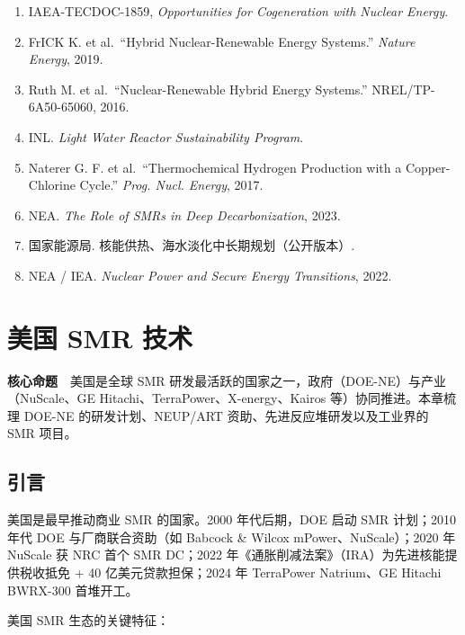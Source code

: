 \documentclass[
  UTF8,
  scheme=plain,
  fontsize=10pt,
  openany
]{ctexbook}
\begin{document}
\begin{enumerate}
\def\labelenumi{\arabic{enumi}.}
\tightlist
\item
  IAEA-TECDOC-1859, \emph{Opportunities for Cogeneration with Nuclear
  Energy}.
\item
  FrICK K. et al.~``Hybrid Nuclear-Renewable Energy Systems.''
  \emph{Nature Energy}, 2019.
\item
  Ruth M. et al.~``Nuclear-Renewable Hybrid Energy Systems.''
  NREL/TP-6A50-65060, 2016.
\item
  INL. \emph{Light Water Reactor Sustainability Program}.
\item
  Naterer G. F. et al.~``Thermochemical Hydrogen Production with a
  Copper-Chlorine Cycle.'' \emph{Prog. Nucl. Energy}, 2017.
\item
  NEA. \emph{The Role of SMRs in Deep Decarbonization}, 2023.
\item
  国家能源局. 核能供热、海水淡化中长期规划（公开版本）.
\item
  NEA / IEA. \emph{Nuclear Power and Secure Energy Transitions}, 2022.
\end{enumerate}

\cleardoublepage

\chapter{美国 SMR 技术}\label{ux7f8eux56fd-smr-ux6280ux672f}

\begin{epigraph}

\textbf{核心命题}　美国是全球 SMR
研发最活跃的国家之一，政府（DOE-NE）与产业（NuScale、GE
Hitachi、TerraPower、X-energy、Kairos 等）协同推进。本章梳理 DOE-NE
的研发计划、NEUP/ART 资助、先进反应堆研发以及工业界的 SMR 项目。

\end{epigraph}

\section{引言}\label{ux5f15ux8a00-13}

美国是最早推动商业 SMR 的国家。2000 年代后期，DOE 启动 SMR 计划；2010
年代 DOE 与厂商联合资助（如 Babcock \& Wilcox mPower、NuScale）；2020 年
NuScale 获 NRC 首个 SMR DC；2022
年《通胀削减法案》（IRA）为先进核能提供税收抵免 + 40
亿美元贷款担保；2024 年 TerraPower Natrium、GE Hitachi BWRX-300
首堆开工。

美国 SMR 生态的关键特征：
\end{document}
